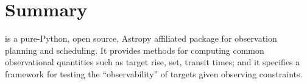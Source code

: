 \section{Summary}

\astroplan is a pure-Python, open source, Astropy affiliated package for observation planning and scheduling. It provides methods for computing common observational quantities such as target rise, set, transit times; and it specifies a framework for testing the ``observability'' of targets given observing constraints. 


%
%


